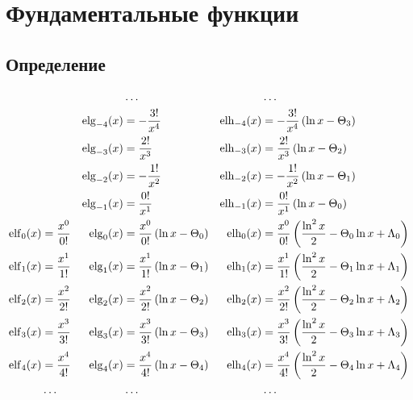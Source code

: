 
\chapter{Фундаментальные функции}

\section{Определение}

\begin{equation*} \begin{aligned}
&&
&\ldots &
&\ldots \\
%
&&
\elg_{-4}(x) &=
- \frac{3!}{x^4} &
\elh_{-4}(x) &=
- \frac{3!}{x^4} \left(
  \ln{x} - \Theta_3 \right) \\
%
&&
\elg_{-3}(x) &=
  \frac{2!}{x^3} &
\elh_{-3}(x) &=
  \frac{2!}{x^3} \left(
  \ln{x} - \Theta_2 \right) \\
%
&& 
\elg_{-2}(x) &=
- \frac{1!}{x^2} &
\elh_{-2}(x) &=
- \frac{1!}{x^2} \left(
  \ln{x} - \Theta_1 \right) \\
%
&& 
\elg_{-1}(x) &=
  \frac{0!}{x^1} &
\elh_{-1}(x) &=
  \frac{0!}{x^1} \left(
  \ln{x} - \Theta_0 \right) \\
%
\elf_0(x) &=
  \frac{x^0}{0!} &
\elg_0(x) &= 
  \frac{x^0}{0!} \left(
  \ln{x} - \Theta_0 \right) &
\elh_0(x) &=
  \frac{x^0}{0!} \left(
  \frac{\ln^2{x}}{2}
- \Theta_0 \ln{x}
+ \Lambda_0 \right) \\
%
\elf_1(x) &=
  \frac{x^1}{1!} &
\elg_1(x) &= 
  \frac{x^1}{1!} \left(
  \ln{x} - \Theta_1 \right) &
\elh_1(x) &=
  \frac{x^1}{1!} \left(
  \frac{\ln^2{x}}{2}
- \Theta_1 \ln{x}
+ \Lambda_1 \right) \\
%
\elf_2(x) &=
  \frac{x^2}{2!} &
\elg_2(x) &= 
  \frac{x^2}{2!} \left(
  \ln{x} - \Theta_2 \right) &
\elh_2(x) &=
  \frac{x^2}{2!} \left(
  \frac{\ln^2{x}}{2}
- \Theta_2 \ln{x}
+ \Lambda_2 \right) \\
%
\elf_3(x) &=
  \frac{x^3}{3!} &
\elg_3(x) &= 
  \frac{x^3}{3!} \left(
  \ln{x} - \Theta_3 \right) &
\elh_3(x) &=
  \frac{x^3}{3!} \left(
  \frac{\ln^2{x}}{2}
- \Theta_3 \ln{x}
+ \Lambda_3 \right) \\
%
\elf_4(x) &=
  \frac{x^4}{4!} &
\elg_4(x) &= 
  \frac{x^4}{4!} \left(
  \ln{x} - \Theta_4 \right) &
\elh_4(x) &=
  \frac{x^4}{4!} \left(
  \frac{\ln^2{x}}{2}
- \Theta_4 \ln{x}
+ \Lambda_4 \right) \\
%
&\ldots &
&\ldots &
&\ldots \\
\end{aligned} \end{equation*}
